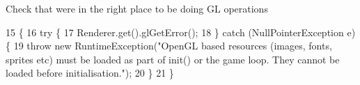 Check that we\textquotesingle{}re in the right place to be doing GL operations 
\begin{DoxyCode}
15                                         \{
16         \textcolor{keywordflow}{try} \{
17             Renderer.get().glGetError();
18         \} \textcolor{keywordflow}{catch} (NullPointerException e) \{
19             \textcolor{keywordflow}{throw} \textcolor{keyword}{new} RuntimeException(\textcolor{stringliteral}{"OpenGL based resources (images, fonts, sprites etc) must be loaded
       as part of init() or the game loop. They cannot be loaded before initialisation."});
20         \}
21     \}
\end{DoxyCode}
